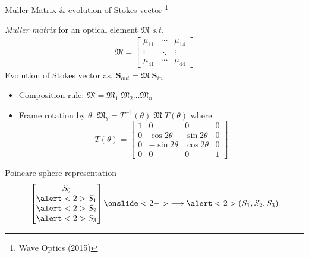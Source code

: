 \documentclass[12pt, dvipsnames]{beamer}
\numberwithin{equation}{section}
\newcommand\blfootnote[1]{%
	\begingroup
	\renewcommand\thefootnote{}\footnote{#1}%
	\addtocounter{footnote}{-1}%
	\endgroup
}
\begin{document}
\begin{frame}{Muller Matrix \& evolution of Stokes vector}\blfootnote{Wave Optics (2015)}
	\textit{Muller matrix} for an optical element $\boldsymbol{\mathfrak{M}}$ \textit{s.t.} 
	\begin{align*}\boldsymbol{\mathfrak{M}}=
		\begin{bmatrix}
			\mu_{11} & \cdots & \mu_{14}\\
			\vdots & \ddots & \vdots\\
			\mu_{41} & \cdots & \mu_{44}
		\end{bmatrix}
	\end{align*}\pause
	Evolution of Stokes vector as,
	$\boldsymbol{S}_{out}=\boldsymbol{\mathfrak{M}}\;\boldsymbol{S}_{in}$\pause
	\begin{itemize}
		\item Composition rule: $\boldsymbol{\mathfrak{M}}=\boldsymbol{\mathfrak{M}}_1\;\boldsymbol{\mathfrak{M}}_2 \dots {\boldsymbol{\mathfrak{M}}_n}$
		\item Frame rotation by $\theta$:
		$\boldsymbol{\mathfrak{M}}_\theta = T^{-1}(\theta)\;\boldsymbol{\mathfrak{M}}\;T(\theta)$ where $$			T(\theta)=
			\begin{bmatrix}
				1 & 0 & 0 & 0\\
				0 & \cos2\theta & \sin2\theta & 0 \\
				0 & -\sin2\theta & \cos2\theta & 0\\
				0 & 0 & 0 & 1
			\end{bmatrix}$$
	\end{itemize}
\end{frame}

\begin{frame}[t]{Poincare sphere representation}
	\begin{align*}
		{\begin{bmatrix} S_0\\ \alert<2>{S_1}\\ \alert<2>{S_2}\\ \alert<2>{S_3}\end{bmatrix} 
			\onslide<2->{\longrightarrow 
		\alert<2>{( S_1, S_2, S_3)}}}
	\end{align*}
	
\end{frame}
\end{document}
